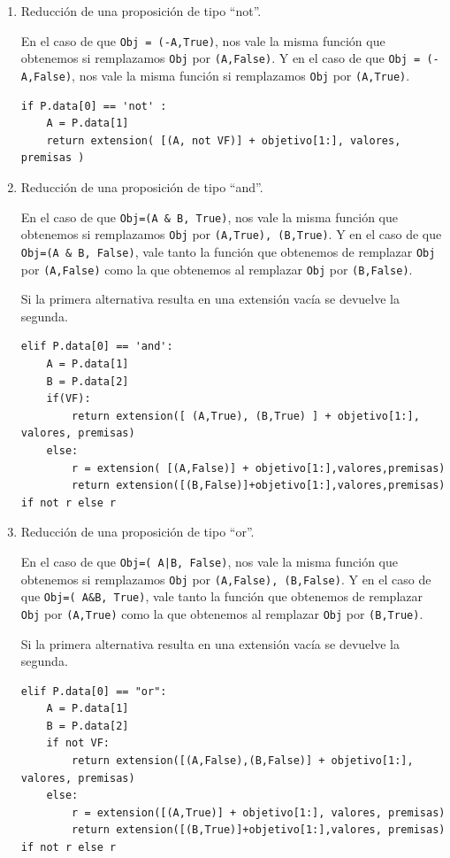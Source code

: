 \documentclass[10pt,a4paper]{report}
\begin{document}
\begin{enumerate}
\item Reducción de una proposición de tipo ``not''.
\label{sec:orgfef64b5}

En el caso de que \texttt{Obj = (-A,True)}, nos vale la misma función que obtenemos si remplazamos \texttt{Obj} por \texttt{(A,False)}. 
Y en el caso de que \texttt{Obj = (-A,False)}, nos vale la misma función si remplazamos \texttt{Obj} por \texttt{(A,True)}.
\begin{verbatim}
if P.data[0] == 'not' :   
    A = P.data[1]
    return extension( [(A, not VF)] + objetivo[1:], valores, premisas )
\end{verbatim}
\item Reducción de una proposición de tipo ``and''.
\label{sec:org468e297}

En el caso de que \texttt{Obj=(A \& B, True)}, nos vale la misma función que obtenemos si remplazamos \texttt{Obj} por \texttt{(A,True), (B,True)}. 
Y en el caso de que \texttt{Obj=(A \& B, False)}, vale tanto la función que obtenemos de remplazar \texttt{Obj} por \texttt{(A,False)} como la que obtenemos al remplazar \texttt{Obj} por \texttt{(B,False)}.

Si la primera alternativa resulta en una extensión vacía se devuelve la segunda.
\begin{verbatim}
elif P.data[0] == 'and':
    A = P.data[1]
    B = P.data[2]
    if(VF):
        return extension([ (A,True), (B,True) ] + objetivo[1:], valores, premisas)
    else:
        r = extension( [(A,False)] + objetivo[1:],valores,premisas)
        return extension([(B,False)]+objetivo[1:],valores,premisas) if not r else r

\end{verbatim}
\item Reducción de una proposición de tipo ``or''.
\label{sec:org7f40671}

En el caso de que \texttt{Obj=( A|B, False)}, nos vale la misma función que obtenemos si remplazamos \texttt{Obj} por \texttt{(A,False), (B,False)}.
Y en el caso de que \texttt{Obj=( A\&B, True)}, vale tanto la función que obtenemos de remplazar \texttt{Obj} por \texttt{(A,True)} como la que obtenemos al remplazar \texttt{Obj} por \texttt{(B,True)}.

Si la primera alternativa resulta en una extensión vacía se devuelve la segunda.
\begin{verbatim}
elif P.data[0] == "or":
    A = P.data[1]
    B = P.data[2]
    if not VF:
        return extension([(A,False),(B,False)] + objetivo[1:], valores, premisas)
    else:
        r = extension([(A,True)] + objetivo[1:], valores, premisas)
        return extension([(B,True)]+objetivo[1:],valores, premisas) if not r else r


\end{verbatim}
\end{enumerate}
\end{document}
